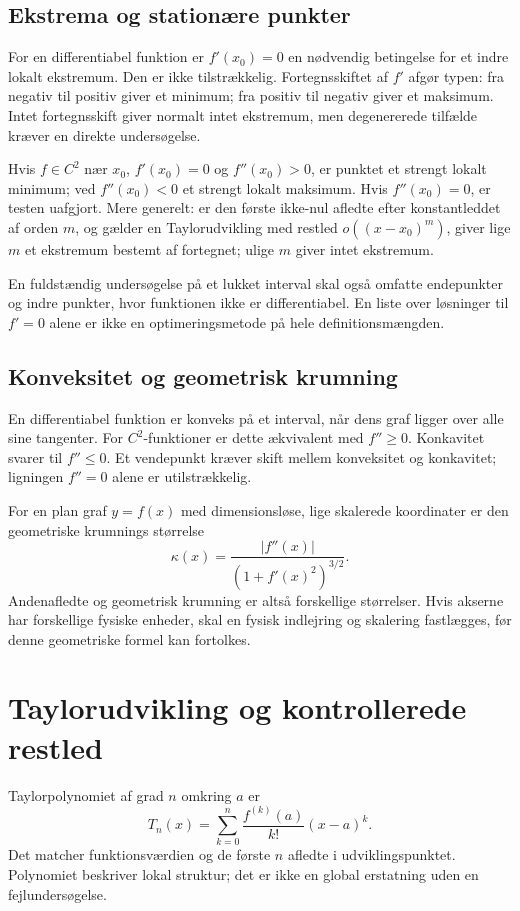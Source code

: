 \subsection{Ekstrema og stationære punkter}
For en differentiabel funktion er $f'(x_0)=0$ en nødvendig betingelse for et indre lokalt ekstremum. Den er ikke tilstrækkelig. Fortegnsskiftet af $f'$ afgør typen: fra negativ til positiv giver et minimum; fra positiv til negativ giver et maksimum. Intet fortegnsskift giver normalt intet ekstremum, men degenererede tilfælde kræver en direkte undersøgelse.

Hvis $f\in C^2$ nær $x_0$, $f'(x_0)=0$ og $f''(x_0)>0$, er punktet et strengt lokalt minimum; ved $f''(x_0)<0$ et strengt lokalt maksimum. Hvis $f''(x_0)=0$, er testen uafgjort. Mere generelt: er den første ikke-nul afledte efter konstantleddet af orden $m$, og gælder en Taylorudvikling med restled $o((x-x_0)^m)$, giver lige $m$ et ekstremum bestemt af fortegnet; ulige $m$ giver intet ekstremum.

En fuldstændig undersøgelse på et lukket interval skal også omfatte endepunkter og indre punkter, hvor funktionen ikke er differentiabel. En liste over løsninger til $f'=0$ alene er ikke en optimeringsmetode på hele definitionsmængden.

\subsection{Konveksitet og geometrisk krumning}
En differentiabel funktion er konveks på et interval, når dens graf ligger over alle sine tangenter. For $C^2$-funktioner er dette ækvivalent med $f''\ge0$. Konkavitet svarer til $f''\le0$. Et vendepunkt kræver skift mellem konveksitet og konkavitet; ligningen $f''=0$ alene er utilstrækkelig.

For en plan graf $y=f(x)$ med dimensionsløse, lige skalerede koordinater er den geometriske krumnings størrelse
\[
 \kappa(x)=\frac{|f''(x)|}{(1+f'(x)^2)^{3/2}}.
\]
Andenafledte og geometrisk krumning er altså forskellige størrelser. Hvis akserne har forskellige fysiske enheder, skal en fysisk indlejring og skalering fastlægges, før denne geometriske formel kan fortolkes.



\section{Taylorudvikling og kontrollerede restled}
\label{sec:taylor}
Taylorpolynomiet af grad $n$ omkring $a$ er
\[
 T_n(x)=\sum_{k=0}^n\frac{f^{(k)}(a)}{k!}(x-a)^k.
\]
Det matcher funktionsværdien og de første $n$ afledte i udviklingspunktet. Polynomiet beskriver lokal struktur; det er ikke en global erstatning uden en fejlundersøgelse.

